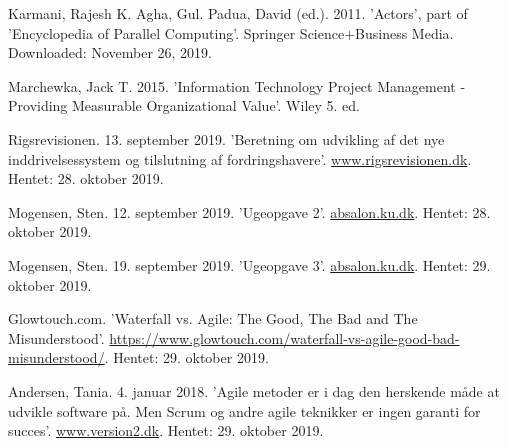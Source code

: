 \begin{thebibliography}{9}
Karmani, Rajesh K. Agha, Gul. Padua, David (ed.). 2011. 'Actors', part of 'Encyclopedia of Parallel Computing'. Springer Science+Business Media. Downloaded: November 26, 2019.

Marchewka, Jack T. 2015. 'Information Technology Project Management - Providing Measurable Organizational Value'. Wiley 5. ed.

Rigsrevisionen. 13. september 2019. 'Beretning om udvikling af det nye inddrivelsessystem og tilslutning af fordringshavere'. \url{www.rigsrevisionen.dk}. Hentet: 28. oktober 2019.

Mogensen, Sten. 12. september 2019. 'Ugeopgave 2'. \url{absalon.ku.dk}. Hentet: 28. oktober 2019.

Mogensen, Sten. 19. september 2019. 'Ugeopgave 3'. \url{absalon.ku.dk}. Hentet: 29. oktober 2019.

Glowtouch.com. 'Waterfall vs. Agile: The Good, The Bad and The Misunderstood'. \url{https://www.glowtouch.com/waterfall-vs-agile-good-bad-misunderstood/}. Hentet: 29. oktober 2019.

Andersen, Tania. 4. januar 2018. 'Agile metoder er i dag den herskende måde at udvikle software på. Men Scrum og andre agile teknikker er ingen garanti for succes'. \url{www.version2.dk}. Hentet: 29. oktober 2019.
\end{thebibliography}